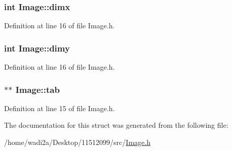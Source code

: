 \subsubsection[{dimx}]{\setlength{\rightskip}{0pt plus 5cm}int Image\+::dimx}\label{structImage_a1fbf685f50372de48b7290cd02a77b0c}


Definition at line 16 of file Image.\+h.

\hypertarget{structImage_a2e937e4780121e32bce2ccae87069b68}{}
\subsubsection[{dimy}]{\setlength{\rightskip}{0pt plus 5cm}int Image\+::dimy}\label{structImage_a2e937e4780121e32bce2ccae87069b68}


Definition at line 16 of file Image.\+h.

\hypertarget{structImage_aad00390430c4e4e3a5a71bb919a4076c}{}
\subsubsection[{tab}]{$\ast$$\ast$ Image\+::tab}\label{structImage_aad00390430c4e4e3a5a71bb919a4076c}


Definition at line 15 of file Image.\+h.



The documentation for this struct was generated from the following file\+:\begin{DoxyCompactItemize}
\item 
/home/wadi2a/\+Desktop/11512099/src/\hyperlink{Image_8h}{Image.\+h}\end{DoxyCompactItemize}
